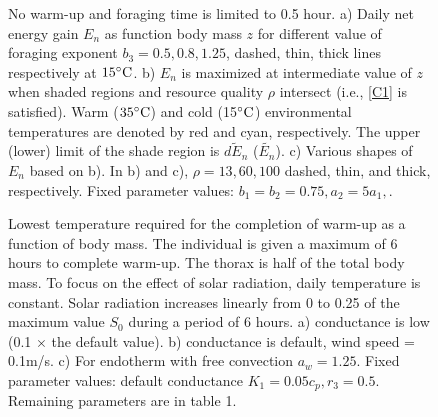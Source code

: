 \newpage
%
\begin{figure}[H]
\begin{center}
\caption{
	No warm-up and foraging time is limited to 0.5 hour.
	a) Daily net energy gain  $E_n$ as function body mass $z$ for different value of foraging exponent $b_3 = 0.5, 0.8, 1.25$, dashed, thin, thick lines respectively  at $15 ^{\circ} \rm{C}$.
	b) $E_n$ is maximized at intermediate value of $z$  when shaded regions and resource quality $\rho$ intersect (i.e., \cref{C1} is satisfied).
	Warm ($35^{\circ} \rm{C}$) and cold (15$^{\circ} \rm{C}$) environmental temperatures are denoted by red and cyan, respectively.
	The upper (lower) limit of the shade region is $\widetilde{dE_n}$ ($\widetilde{E_n}$).  
	c) Various shapes of $E_n$ based on b).
	In b) and c), $\rho = 13, 60, 100$ dashed, thin, and thick, respectively.
	Fixed parameter values: $b_1 = b_2 = 0.75, a_2 = 5 a_1, $.
}
\label{fig3}
\end{center}
\end{figure}
%
\begin{figure}[H]
\begin{center}
\caption{
	Lowest temperature required for the completion of warm-up as a function of body mass.
	The individual is given a maximum of 6 hours to complete warm-up.
	The thorax is half of the total body mass.
	To focus on the effect of solar radiation, daily temperature is constant.
	Solar radiation increases linearly from 0 to 0.25 of the maximum value $S_0$ during a period of 6 hours. 
	a) conductance is low (0.1 $\times$ the default value).
	b) conductance is default, wind speed  = 0.1m/s.
	c) For endotherm with free convection $a_w = 1.25$. 
	Fixed parameter values: default conductance $K_1 = 0.05 c_p, r_3 = 0.5$.
	Remaining parameters are in table 1.
}%
\label{fig4}
\end{center}
\end{figure}
